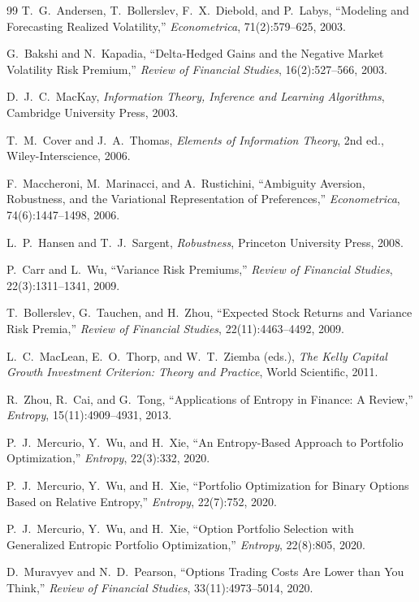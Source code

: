 \documentclass[11pt]{article}
\begin{document}
\begin{thebibliography}{99}
 T.~G.~Andersen, T.~Bollerslev, F.~X.~Diebold, and
P.~Labys, ``Modeling and Forecasting Realized Volatility,''
\emph{Econometrica}, 71(2):579--625, 2003.

 G.~Bakshi and N.~Kapadia, ``Delta-Hedged Gains and
the Negative Market Volatility Risk Premium,'' \emph{Review of Financial
Studies}, 16(2):527--566, 2003.

 D.~J.~C.~MacKay, \emph{Information Theory, Inference and
Learning Algorithms}, Cambridge University Press, 2003.

 T.~M.~Cover and J.~A.~Thomas, \emph{Elements of
Information Theory}, 2nd ed., Wiley-Interscience, 2006.

 F.~Maccheroni, M.~Marinacci, and A.~Rustichini,
``Ambiguity Aversion, Robustness, and the Variational Representation of
Preferences,'' \emph{Econometrica}, 74(6):1447--1498, 2006.

 L.~P.~Hansen and T.~J.~Sargent, \emph{Robustness},
Princeton University Press, 2008.

 P.~Carr and L.~Wu, ``Variance Risk Premiums,''
\emph{Review of Financial Studies}, 22(3):1311--1341, 2009.

 T.~Bollerslev, G.~Tauchen, and H.~Zhou, ``Expected
Stock Returns and Variance Risk Premia,'' \emph{Review of Financial Studies},
22(11):4463--4492, 2009.

 L.~C.~MacLean, E.~O.~Thorp, and W.~T.~Ziemba (eds.),
\emph{The Kelly Capital Growth Investment Criterion: Theory and Practice},
World Scientific, 2011.

 R.~Zhou, R.~Cai, and G.~Tong, ``Applications of Entropy in
Finance: A Review,'' \emph{Entropy}, 15(11):4909--4931, 2013.

 P.~J.~Mercurio, Y.~Wu, and H.~Xie, ``An
Entropy-Based Approach to Portfolio Optimization,'' \emph{Entropy}, 22(3):332,
2020.

 P.~J.~Mercurio, Y.~Wu, and H.~Xie, ``Portfolio
Optimization for Binary Options Based on Relative Entropy,'' \emph{Entropy},
22(7):752, 2020.

 P.~J.~Mercurio, Y.~Wu, and H.~Xie, ``Option
Portfolio Selection with Generalized Entropic Portfolio Optimization,''
\emph{Entropy}, 22(8):805, 2020.

 D.~Muravyev and N.~D.~Pearson, ``Options Trading Costs
Are Lower than You Think,'' \emph{Review of Financial Studies},
33(11):4973--5014, 2020.

\end{thebibliography}
\end{document}
